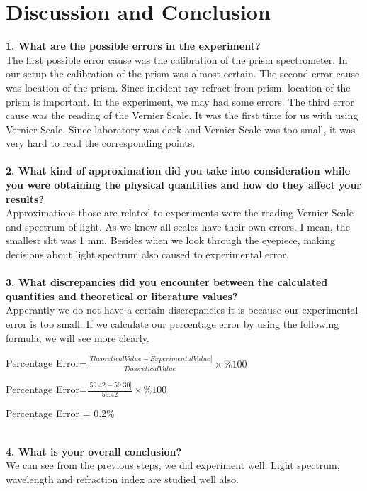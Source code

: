 \documentclass[a4paper,12pt]{report}
\begin{document}
\chapter{Discussion and Conclusion}
\textbf{1. What are the possible errors in the experiment?}\\
The first possible error cause was the calibration of the prism spectrometer. In our setup the calibration of the prism was almost certain.  The second error cause was location of the prism. Since incident ray refract from prism, location of the prism is important. In the experiment, we may had some errors. The third error cause was the reading of the Vernier Scale. It was the first time for us with using Vernier Scale. Since laboratory was dark and Vernier Scale was too small, it was very hard to read the corresponding points.\\ \\ 
\textbf{2. What kind of approximation did you take into consideration while you were obtaining the physical quantities and how do they affect your results?}\\
Approximations those are related to experiments were the reading Vernier Scale and spectrum of light. As we know all scales have their own errors. I mean, the smallest slit was 1 mm. Besides when we look through the eyepiece, making decisions about light spectrum also caused to experimental error.\\\\
\textbf{3. What discrepancies did you encounter between the calculated quantities and theoretical or literature values?}\\
Apperantly we do not have a certain discrepancies it is because our experimental error is too small. If we calculate our percentage error by using the following formula, we will see more clearly.

\begin{center}
	Percentage Error=$\frac{|Theoretical Value-Experimental Value|}{Theoretical Value}\times \% 100$

	Percentage Error=$\frac{|59.42-59.30|}{59.
		42}\times \% 100$

		Percentage Error = 0.2\%
\end{center}
\\
\textbf{4. What is your overall conclusion?}\\
We can see from the previous steps, we did experiment well. Light spectrum, wavelength and refraction index are studied well also.  
\end{document}

